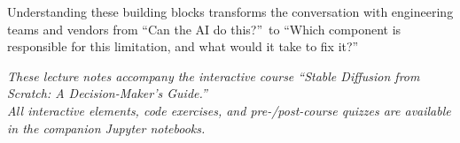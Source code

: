 \documentclass[11pt,a4paper]{article}
\begin{document}
Understanding these building blocks transforms the conversation with
engineering teams and vendors from ``Can the AI do this?''\ to ``Which
component is responsible for this limitation, and what would it take to
fix it?''

\vfill

\begin{center}
\small\color{cGray}
\textit{These lecture notes accompany the interactive course
``Stable Diffusion from Scratch: A Decision-Maker's Guide.''}\\
\textit{All interactive elements, code exercises, and pre-/post-course
quizzes are available in the companion Jupyter notebooks.}
\end{center}
\end{document}
